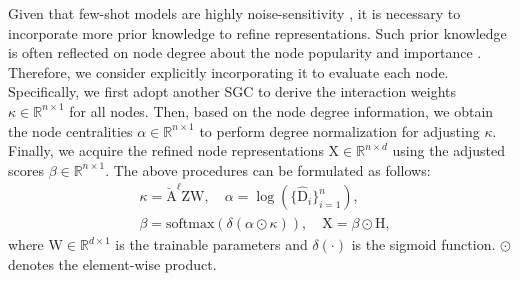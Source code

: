 Given that few-shot models are highly noise-sensitivity \cite{zhang2019variational}, it is necessary to incorporate more prior knowledge to refine representations. Such prior knowledge is often reflected on node degree about the node popularity and importance \cite{Park2019estimating}. %
Therefore, we consider explicitly incorporating it to evaluate each node. Specifically, we first adopt another SGC to derive the interaction weights $\kappa\!\in\!\mathbb R^{n\times 1}$ for all nodes. Then, based on the node degree information, we obtain the node centralities $\alpha\!\in\!\mathbb R^{n\times 1}$ to perform degree normalization for adjusting $\kappa$. Finally, we acquire the refined node representations $\mathrm{X}\!\in\!\mathbb R^{n\times d}$ using the adjusted scores $\beta\!\in\!\mathbb R^{n\times 1}$. The above procedures can be formulated as follows:
\begin{equation}
\label{refine}
    \begin{aligned}
        &\kappa\!=\!\breve{\mathrm{A}}^\ell\mathrm{Z}\mathrm{W}, \quad
        \alpha\!=\!\log(\{\hat{\mathrm{D}}_i\}_{i=1}^n), \\
        &\beta\!=\!\text{softmax}(\delta(\alpha\odot\kappa)), \quad
        \mathrm{X}\!=\!\beta \odot \mathrm{H},
    \end{aligned}
\end{equation}
where $\mathrm{W}\!\in\!\mathbb R^{d\times1}$ is the trainable parameters and $\delta(\cdot)$ is the sigmoid function. $\odot$ denotes the element-wise product.

